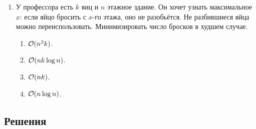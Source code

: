 \begin{enumerate}
\subsection*{Дополнительные задачи}

  \item
    У профессора есть $k$ яиц и $n$ этажное здание.
    Он хочет узнать максимальное $x$: если яйцо бросить с $x$-го этажа, оно не разобьётся.
    Не разбившиеся яйца можно переиспользовать. Минимизировать число бросков в худшем случае.
    \begin{enumerate}
      \item $\mathcal{O}(n^2 k)$.
      \item $\mathcal{O}(n k \log{n})$.
      \item $\mathcal{O}(n k)$.
      \item $\mathcal{O}(n \log{n})$.
    \end{enumerate}

\end{enumerate}

\newpage

\subsection{Решения}

